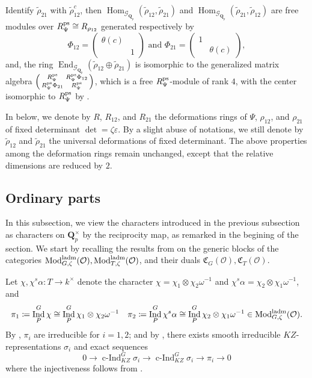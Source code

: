 \documentclass[leqno]{amsart}
\newcommand{\smat}[1]{\left( \begin{smallmatrix} #1 \end{smallmatrix} \right)}
\newcommand{\Gp}{\mathcal{G}_{\Qp}} %
\newcommand{\laMod}{\textnormal{Mod}^{\textnormal{ladm}}}
\newcommand{\ps}{\textnormal{ps}}
\newcommand{\Qp}{\mathbf{Q}_p}
\newcommand{\oo}{\mathcal O}
\newcommand{\1}{\mathbf{1}}
\newcommand{\fC}{\mathfrak C}
\DeclareMathOperator{\End}{End}
\DeclareMathOperator{\Hom}{Hom}
\DeclareMathOperator{\Ind}{Ind}
\DeclareMathOperator{\cInd}{c-Ind}
\theoremstyle{definition}
\theoremstyle{remark}
\begin{document}
Identify $\tilde{\rho}_{21}$ with $\tilde{\rho}_{12}^c$,
then
$\Hom_{\Gp}(\tilde{\rho}_{12}, \tilde{\rho}_{21})$ and
$\Hom_{\Gp}(\tilde{\rho}_{21}, \tilde{\rho}_{12})$
are free modules over $R_{\Psi}^{\ps}\cong R_{\rho_{12}}$ 
generated respectively by
\begin{equation}\label{eq:Phi_ij}
	\Phi_{12}=\smat{\theta(c)&\\&1} \text{ and }
	\Phi_{21}=\smat{1&\\&\theta(c)},
\end{equation}
and, the ring $\End_{\Gp}(\tilde{\rho}_{12}\oplus \tilde{\rho}_{21})$
is isomorphic to the generalized matrix algebra
$\smat{R_{\Psi}^{\ps}& R_{\Psi}^{\ps}\Phi_{12}\\ R_{\Psi}^{\ps}\Phi_{21}& R_{\Psi}^{\ps}}$,
which is a free $R_{\Psi}^{\ps}$-module of rank  $4$,
with the center isomorphic to  $R_{\Psi}^{\ps}$
by \cite[Prop B.26]{pask}.

In below, we denote by 
$R$,  $R_{12}$, and $R_{21}$
the deformations rings of 
$\Psi$,  $\rho_{12}$, and $\rho_{21}$
of fixed determinant $\det=\zeta\varepsilon$.
By a slight abuse of notations,
we still denote by $\tilde{\rho}_{12}$
and $\tilde{\rho}_{21}$ the universal deformations
of fixed determinant.
The above properties among the deformation rings
remain unchanged,
except that the relative dimensions are reduced by $2$.

\subsection{Ordinary parts}

In this subsection,
we view the characters introduced 
in the previous subsection as characters
on $\Qp^\times$ by the reciprocity map,
as remarked in the begining of the section.
We start by recalling the results from
\cite[\S 7 \S 8]{pask}
on the generic blocks of the categories
$\laMod_{G,\zeta}(\oo), \laMod_{T,\zeta}(\oo)$,
and their duals $\fC_G(\oo), \fC_T(\oo)$.

Let $\chi, \chi^s\alpha\colon T\to k^\times$
denote the character  
$\chi=\chi_1\otimes\chi_2\omega^{-1}$
and  $\chi^s\alpha=\chi_2\otimes \chi_1\omega^{-1}$, and
\[
\pi_1\coloneqq \Ind_{P}^G\chi\cong
\Ind_{P}^G\chi_1\otimes\chi_2\omega^{-1}\quad
\pi_2\coloneqq \Ind_{P}^G\chi^s\alpha\cong 
\Ind_{P}^G\chi_2\otimes\chi_1\omega^{-1} \in \laMod_{G,\zeta}(\oo).
\]
By \cite[Thm 30]{barthel},
$\pi_i$ are irreducible for  $i=1,2$;
and by \cite[Thm 33]{barthel}, there exists
smooth irreducible $KZ$-representations $\sigma_i$
and exact sequences
\begin{equation}
	0\to \cInd_{KZ}^G\sigma_i\to
	\cInd_{KZ}^G\sigma_i\to \pi_i\to 0
\end{equation}
where the injectiveness follows from \cite[Thm 19]{barthel}.
\end{document}
